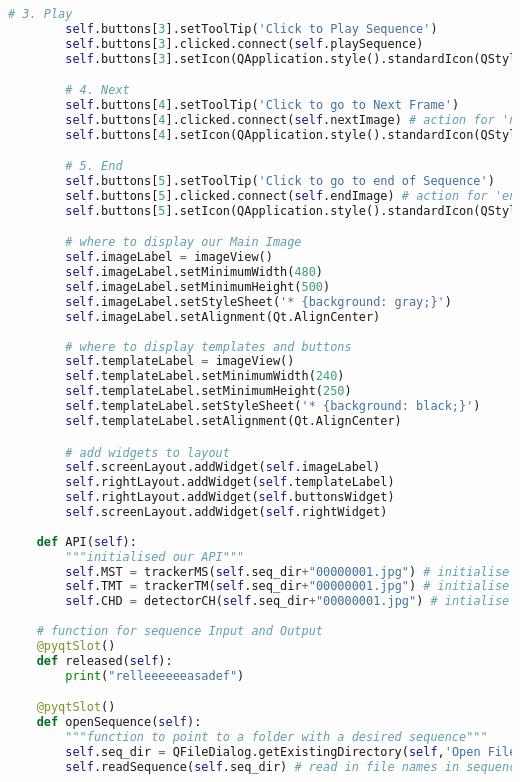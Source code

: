 \begin{lstlisting}[language=Python, caption={GUI Impementation Code}, captionpos=b, label={lst:gui}]
        # 3. Play
        self.buttons[3].setToolTip('Click to Play Sequence')
        self.buttons[3].clicked.connect(self.playSequence)
        self.buttons[3].setIcon(QApplication.style().standardIcon(QStyle.SP_MediaPlay))

        # 4. Next
        self.buttons[4].setToolTip('Click to go to Next Frame')
        self.buttons[4].clicked.connect(self.nextImage) # action for 'next' button
        self.buttons[4].setIcon(QApplication.style().standardIcon(QStyle.SP_MediaSeekForward))

        # 5. End
        self.buttons[5].setToolTip('Click to go to end of Sequence')
        self.buttons[5].clicked.connect(self.endImage) # action for 'end' button
        self.buttons[5].setIcon(QApplication.style().standardIcon(QStyle.SP_MediaSkipForward))

        # where to display our Main Image
        self.imageLabel = imageView()
        self.imageLabel.setMinimumWidth(480)
        self.imageLabel.setMinimumHeight(500)
        self.imageLabel.setStyleSheet('* {background: gray;}')
        self.imageLabel.setAlignment(Qt.AlignCenter)
        
        # where to display templates and buttons
        self.templateLabel = imageView()
        self.templateLabel.setMinimumWidth(240)
        self.templateLabel.setMinimumHeight(250)
        self.templateLabel.setStyleSheet('* {background: black;}')
        self.templateLabel.setAlignment(Qt.AlignCenter)

        # add widgets to layout
        self.screenLayout.addWidget(self.imageLabel)
        self.rightLayout.addWidget(self.templateLabel)
        self.rightLayout.addWidget(self.buttonsWidget)
        self.screenLayout.addWidget(self.rightWidget)
        
    def API(self):
        """initialised our API"""
        self.MST = trackerMS(self.seq_dir+"00000001.jpg") # initialise trackerMS object
        self.TMT = trackerTM(self.seq_dir+"00000001.jpg") # initialise trackerTM object
        self.CHD = detectorCH(self.seq_dir+"00000001.jpg") # intialise detectorCH object
                
    # function for sequence Input and Output
    @pyqtSlot()
    def released(self):
        print("relleeeeeeasadef")

    @pyqtSlot()
    def openSequence(self):
        """function to point to a folder with a desired sequence"""
        self.seq_dir = QFileDialog.getExistingDirectory(self,'Open File') # store path to sequence
        self.readSequence(self.seq_dir) # read in file names in sequence into self.paths
  

\end{lstlisting}

